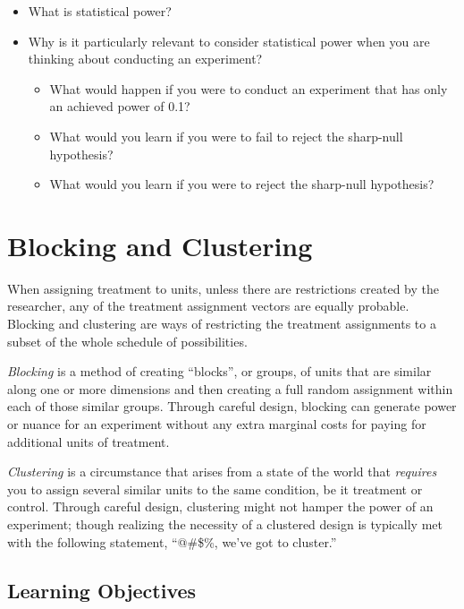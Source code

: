 \documentclass[
]{book}
\providecommand{\tightlist}{%
  \setlength{\itemsep}{0pt}\setlength{\parskip}{0pt}}
\begin{document}
\begin{itemize}
\tightlist
\item
  What is statistical power?
\item
  Why is it particularly relevant to consider statistical power when you
  are thinking about conducting an experiment?

  \begin{itemize}
  \tightlist
  \item
    What would happen if you were to conduct an experiment that has only
    an achieved power of 0.1?
  \item
    What would you learn if you were to fail to reject the sharp-null
    hypothesis?
  \item
    What would you learn if you were to reject the sharp-null
    hypothesis?
  \end{itemize}
\end{itemize}

\hypertarget{blocking-and-clustering}{%
\chapter{Blocking and Clustering}\label{blocking-and-clustering}}

When assigning treatment to units, unless there are restrictions created
by the researcher, any of the treatment assignment vectors are equally
probable. Blocking and clustering are ways of restricting the treatment
assignments to a subset of the whole schedule of possibilities.

\emph{Blocking} is a method of creating ``blocks'', or groups, of units
that are similar along one or more dimensions and then creating a full
random assignment within each of those similar groups. Through careful
design, blocking can generate power or nuance for an experiment without
any extra marginal costs for paying for additional units of treatment.

\emph{Clustering} is a circumstance that arises from a state of the
world that \emph{requires} you to assign several similar units to the
same condition, be it treatment or control. Through careful design,
clustering might not hamper the power of an experiment; though realizing
the necessity of a clustered design is typically met with the following
statement, ``@\#\$\%, we've got to cluster.''

\hypertarget{learning-objectives-3}{%
\section{Learning Objectives}\label{learning-objectives-3}}
\end{document}
